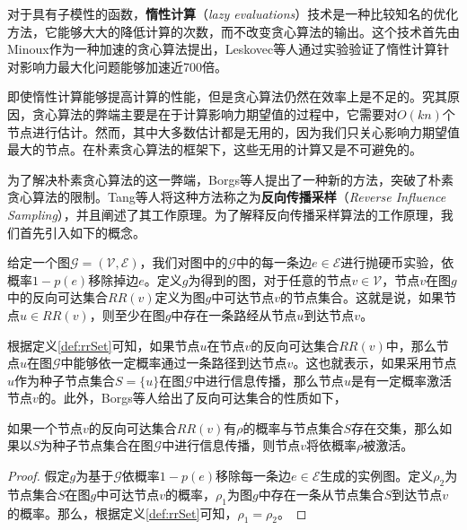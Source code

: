 对于具有子模性的函数，\textbf{惰性计算}（\textit{lazy evaluations}）技术是一种比较知名的优化方法，它能够大大的降低计算的次数，而不改变贪心算法的输出。这个技术首先由Minoux作为一种加速的贪心算法提出，Leskovec等人通过实验验证了惰性计算针对影响力最大化问题能够加速近700倍。

即使惰性计算能够提高计算的性能，但是贪心算法仍然在效率上是不足的。究其原因，贪心算法的弊端主要是在于计算影响力期望值的过程中，它需要对$O\left(kn\right)$个节点进行估计。然而，其中大多数估计都是无用的，因为我们只关心影响力期望值最大的节点。在朴素贪心算法的框架下，这些无用的计算又是不可避免的。

为了解决朴素贪心算法的这一弊端，Borgs等人提出了一种新的方法，突破了朴素贪心算法的限制。Tang等人将这种方法称之为\textbf{反向传播采样}（\textit{Reverse Influence Sampling}），并且阐述了其工作原理。为了解释反向传播采样算法的工作原理，我们首先引入如下的概念。

\begin{mydef}[反向可达集合]\label{def:rrSet}
给定一个图$\mathcal{G}=\left(\mathcal{V}, \mathcal{E}\right)$，我们对图中的$\mathcal{G}$中的每一条边$e \in \mathcal{E}$进行抛硬币实验，依概率$1-p\left(e\right)$移除掉边$e$。定义$g$为得到的图，对于任意的节点$v \in \mathcal{V}$，节点$v$在图$g$中的反向可达集合${RR}\left(v\right)$定义为图$g$中可达节点$v$的节点集合。这就是说，如果节点$u \in {RR}\left(v\right)$，则至少在图$g$中存在一条路经从节点$u$到达节点$v$。
\end{mydef}

根据定义\ref{def:rrSet}可知，如果节点$u$在节点$v$的反向可达集合${RR}\left(v\right)$中，那么节点$u$在图$\mathcal{G}$中能够依一定概率通过一条路径到达节点$v$。这也就表示，如果采用节点$u$作为种子节点集合$S=\{u\}$在图$\mathcal{G}$中进行信息传播，那么节点$u$是有一定概率激活节点$v$的。此外，Borgs等人给出了反向可达集合的性质如下，

\begin{mylem}\label{lem:rrSet}
如果一个节点$v$的反向可达集合${RR}\left(v\right)$有$\rho$的概率与节点集合$S$存在交集，那么如果以$S$为种子节点集合在图$\mathcal{G}$中进行信息传播，则节点$v$将依概率$\rho$被激活。
\end{mylem}

\begin{proof}
假定$g$为基于$\mathcal{G}$依概率$1-p\left(e\right)$移除每一条边$e \in \mathcal{E}$生成的实例图。定义$\rho_2$为节点集合$S$在图$g$中可达节点$v$的概率，$\rho_1$为图$g$中存在一条从节点集合$S$到达节点$v$的概率。那么，根据定义\ref{def:rrSet}可知，$\rho_1 = \rho_2$。
\end{proof}

